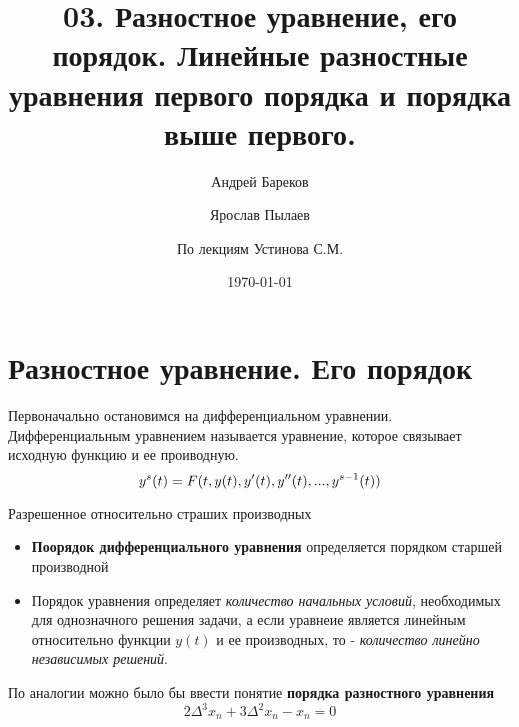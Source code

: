 \documentclass[a4paper,11pt]{article}
\title{03. Разностное уравнение, его порядок. Линейные разностные уравнения первого порядка и порядка выше первого.}
\author{Андрей Бареков \and Ярослав Пылаев \and По лекциям Устинова С.М.}
\date{\today}
\begin{document}
\maketitle
\newpage


\section{Разностное уравнение. Его порядок}
  Первоначально остановимся на дифференциальном уравнении. Дифференциальным уравнением называется уравнение, которое связывает исходную функцию и ее проиводную.
  \begin{equation}
  y^{s}(t) = F(t, y(t), y'(t), y''(t), ..., y^{s-1}(t)) \\
  \end{equation}
  \begin{center}
  Разрешенное относительно страших производных
  \end{center}

  \begin{itemize}
    \item \textbf{Поорядок дифференциального уравнения} определяется порядком старшей производной
    \item Порядок уравнения определяет \textit{количество начальных условий}, необходимых для однозначного решения задачи, а если уравнеие является линейным относительно функции $y(t)$ и ее производных, то - \textit{количество линейно независимых решений}.
  \end{itemize}

  По аналогии можно было бы ввести понятие \textbf{порядка разностного уравнения}
  \begin{equation}
    2\Delta^3 x_n + 3\Delta^2 x_n - x_n = 0
    \label{eq:DiffEq}
  \end{equation}
\end{document}
